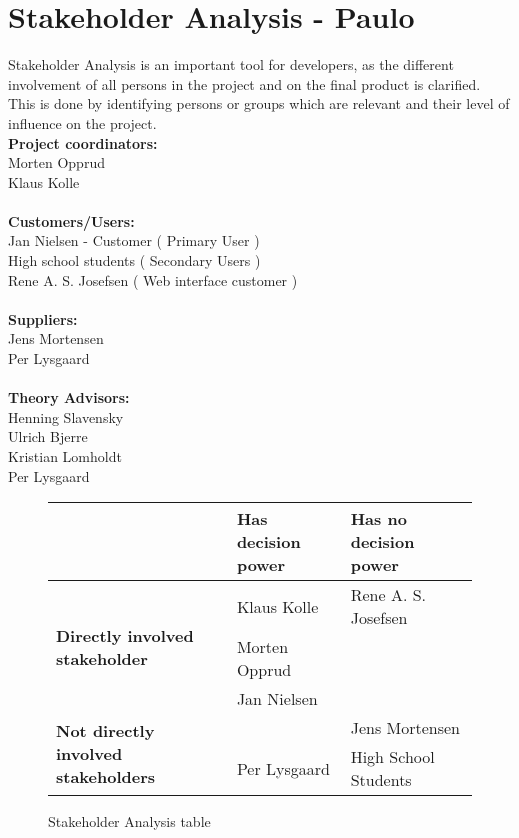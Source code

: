 \section{Stakeholder Analysis - Paulo}

Stakeholder Analysis is an important tool for developers, as the different involvement of all persons in the project and on the final product is clarified. This is done by identifying persons or groups which are relevant and their level of influence on the project.
\\[0.2cm]
\textbf{Project coordinators:}\\ Morten Opprud\\ Klaus Kolle\\
\\
\textbf{Customers/Users:}\\
Jan Nielsen - Customer ( Primary User )\\
High school students ( Secondary Users )\\
Rene A. S. Josefsen ( Web interface customer )\\
\\
\textbf{Suppliers:}\\
Jens Mortensen\\
Per Lysgaard\\
\\
\textbf{Theory Advisors:}\\
Henning Slavensky\\
Ulrich Bjerre\\
Kristian Lomholdt\\
Per Lysgaard\\

\begin{figure}[h!]
 \begin{center}
  \begin{tabular}{| l | l | l |}
   \hline
    & \textbf{Has decision power} & \textbf{Has no decision power} \\ \hline
    \multirow{3}{*}{\textbf{Directly involved stakeholder}} 
    	& Klaus Kolle & Rene A. S. Josefsen\\ 
    	& Morten Opprud &  \\ 
    	& Jan Nielsen &  \\ \hline
    \multirow{2}{*}{\textbf{Not directly involved stakeholders}} 
    	&  & Jens Mortensen\\
    	& Per Lysgaard & High School Students \\ \hline
   \end{tabular}
  \end{center}
 \caption{Stakeholder Analysis table}
\end{figure}

